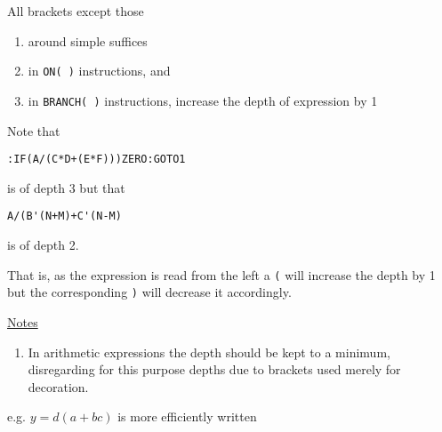 \documentclass[10pt, a4paper, oneside]{article}
\newcommand{\myuline}[1]{\uline{#1}}
\newcommand{\mytt}[1]{\texttt{\scriptsize #1}}
\newcommand{\mytt}[1]{\texttt{\small #1}}
\begin{document}
\begin{multicols}{2}
All brackets except those

\renewcommand{\labelenumi}{(\roman{enumi})}
\begin{enumerate}
\def\theenumi{\roman{enumi}}
\item around simple suffices
\item in \mytt{ON( )} instructions, and
\item in \mytt{BRANCH( )} instructions,
increase the depth of expression by 1
\end{enumerate}

\begin{flushleft}
Note that
\end{flushleft}

\begin{addmargin}[1cm]{1em}%
\begin{lstlisting}
:IF(A/(C*D+(E*F)))ZERO:GOTO1
\end{lstlisting}
\end{addmargin}

\begin{flushleft}
is of depth 3 but that
\end{flushleft}

\begin{addmargin}[1cm]{1em}%
\begin{lstlisting}
A/(B'(N+M)+C'(N-M)
\end{lstlisting}
\end{addmargin}

\begin{flushleft}
is of depth 2.
\end{flushleft}

That is, as the expression is read from the left
a \mytt{(} will increase the depth by 1 but the corresponding
\mytt{)} will decrease it accordingly.

\begin{flushleft}
\myuline{Notes}
\end{flushleft}

\renewcommand{\labelenumi}{(\theenumi)}
\begin{enumerate}

\item In arithmetic expressions the depth should be
kept to a minimum, disregarding for this purpose depths
due to brackets used merely for decoration.

\end{enumerate}

\begin{flushleft}
e.g. $y = d(a + bc)$ is more efficiently written
\end{flushleft}


\end{multicols}
\end{document}
